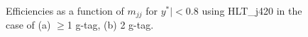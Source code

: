 \begin{figure}[htbp]
        \centering
        \caption{Efficiencies as a function of $m_{jj}$ for $y^{*}|<0.8$ using HLT\_j420 in the case of (a) $\geq$1 g-tag, (b) 2 g-tag.}
        \label{fig: mass turn-on yStar 0.8}
\end{figure}
